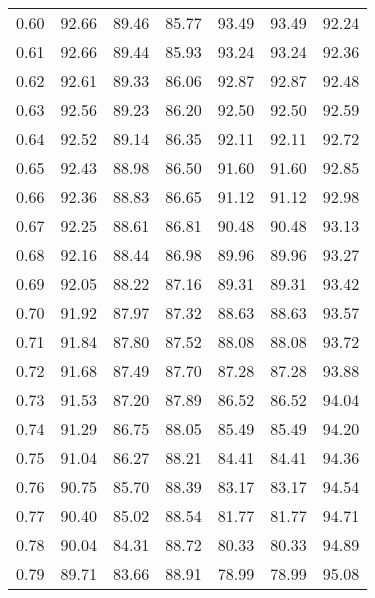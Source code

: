 \begin{tabular}{|c|c|c|c|c|c|c|}
      0.60 &     92.66 &     89.46 &      85.77 &   93.49 &      93.49 &         92.24 \\
      0.61 &     92.66 &     89.44 &      85.93 &   93.24 &      93.24 &         92.36 \\
      0.62 &     92.61 &     89.33 &      86.06 &   92.87 &      92.87 &         92.48 \\
      0.63 &     92.56 &     89.23 &      86.20 &   92.50 &      92.50 &         92.59 \\
      0.64 &     92.52 &     89.14 &      86.35 &   92.11 &      92.11 &         92.72 \\
      0.65 &     92.43 &     88.98 &      86.50 &   91.60 &      91.60 &         92.85 \\
      0.66 &     92.36 &     88.83 &      86.65 &   91.12 &      91.12 &         92.98 \\
      0.67 &     92.25 &     88.61 &      86.81 &   90.48 &      90.48 &         93.13 \\
      0.68 &     92.16 &     88.44 &      86.98 &   89.96 &      89.96 &         93.27 \\
      0.69 &     92.05 &     88.22 &      87.16 &   89.31 &      89.31 &         93.42 \\
      0.70 &     91.92 &     87.97 &      87.32 &   88.63 &      88.63 &         93.57 \\
      0.71 &     91.84 &     87.80 &      87.52 &   88.08 &      88.08 &         93.72 \\
      0.72 &     91.68 &     87.49 &      87.70 &   87.28 &      87.28 &         93.88 \\
      0.73 &     91.53 &     87.20 &      87.89 &   86.52 &      86.52 &         94.04 \\
      0.74 &     91.29 &     86.75 &      88.05 &   85.49 &      85.49 &         94.20 \\
      0.75 &     91.04 &     86.27 &      88.21 &   84.41 &      84.41 &         94.36 \\
      0.76 &     90.75 &     85.70 &      88.39 &   83.17 &      83.17 &         94.54 \\
      0.77 &     90.40 &     85.02 &      88.54 &   81.77 &      81.77 &         94.71 \\
      0.78 &     90.04 &     84.31 &      88.72 &   80.33 &      80.33 &         94.89 \\
      0.79 &     89.71 &     83.66 &      88.91 &   78.99 &      78.99 &         95.08 \\

\end{tabular}
